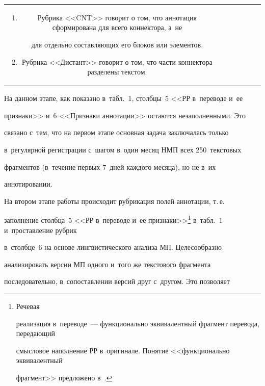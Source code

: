 \begin{table}
\begin{center}
\begin{tabular}{|c|p{20mm}|p{24mm}|p{22mm}|c|c|c|}
{\begin{enumerate}[1.]
\item Рубрика <<CNT>> говорит о том, что аннотация сформирована для всего коннектора, а~не 


для отдельно составляющих его блоков или элементов. 


\item Рубрика <<Дистант>> говорит о том, что части коннектора разделены текстом.


\end{enumerate} }


\end{tabular}


\end{center}


\vspace*{-32pt}


\end{table}


  


  На данном этапе, как показано в~табл.~1, столбцы~5 <<РР в~переводе и~ее 


признаки>> и~6 <<Признаки аннотации>> остаются незаполненными. Это 


связано с~тем, что на первом этапе основная задача заключалась только 


в~регулярной регистрации с~шагом в~один месяц НМП всех 250~текстовых 


фрагментов (в~течение первых 7~дней каждого месяца), но не в~их 


аннотировании. 


  


  На втором этапе работы происходит рубрикация полей аннотации, т.\,е.\ 


заполнение столбца~5 <<РР в~переводе и~ее признаки>>\footnote[2]{Речевая 


реализация в~переводе~--- функционально эквивалентный фрагмент перевода, передающий 


смысловое наполнение РР в~оригинале. Понятие <<функционально эквивалентный 


фрагмент>> предложено в~\cite{21-eg}.} в~табл.~1 и~проставление рубрик 


в~столбце~6 на основе лингвистического анализа МП. Целесообразно 


анализировать версии МП одного и~того же текстового фрагмента 


последовательно, в~сопоставлении версий друг с~другом. Это позволяет 


